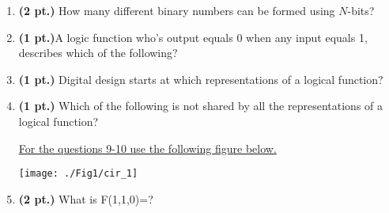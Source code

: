 \documentclass{article}
\begin{document}
\begin{enumerate}
\item {\bf (2 pt.)} How many different binary numbers can be formed
using $N$-bits?

\item {\bf (1 pt.)}A logic function who's output equals 0 when any
input equals 1, describes which of the following?

\item {\bf (1 pt.)} Digital design starts at which representations of a logical function?

\item {\bf (1 pt.)} Which of the following is not shared by all the 
representations of a logical function?

\pagebreak
\underline{For the questions 9-10 use the following figure below.}

\texttt{[image: ./Fig1/cir\_1]}

\item {\bf (2 pt.)} What is F(1,1,0)=?


\end{enumerate}
\end{document}
